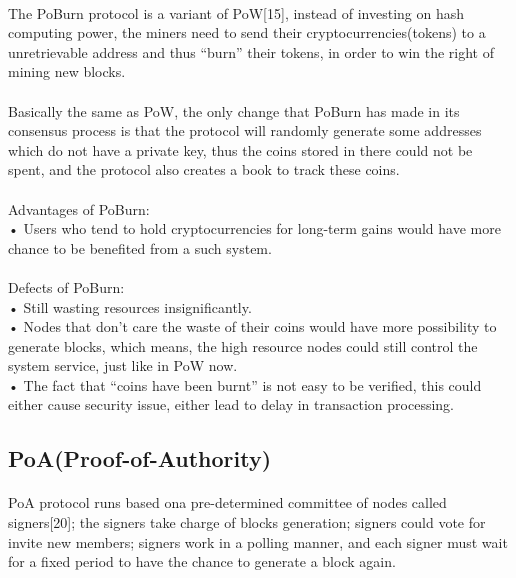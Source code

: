 \documentclass[]{article}
\begin{document}
\begin{CJK*}{UTF8}{gbsn}
		\paragraph{} 
	The PoBurn protocol is a variant of PoW[15], instead of investing on hash computing power, the miners need to send their cryptocurrencies(tokens) to a unretrievable address and thus ``burn'' their tokens, in order to win the right of mining new blocks.
		\paragraph{} 
	Basically the same as PoW, the only change that PoBurn has made in its consensus process is that the protocol will randomly generate some addresses which do not have a private key, thus the coins stored in there could not be spent, and the protocol also creates a book to track these coins. 
	\paragraph{} 
Advantages of PoBurn:
\\• Users who tend to hold cryptocurrencies for long-term gains would have more chance to be benefited from a such system.
	\paragraph{} 
Defects of PoBurn:
\\• Still wasting resources insignificantly.
\\• Nodes that don't care the waste of their coins would have more possibility to generate blocks, which means, the high resource nodes could still control the system service, just like in PoW now.
\\• The fact that ``coins have been burnt'' is not easy to be verified, this could either cause security issue, either lead to delay in transaction processing.
	
	\subsection{PoA(Proof-of-Authority)}
	\paragraph{} 
	PoA protocol runs based ona  pre-determined committee of nodes called signers[20]; the signers take charge of blocks generation; signers could vote for invite new members; signers work in a polling manner, and each signer must wait for a fixed period to have the chance to generate a block again.

\end{CJK*}
\end{document}
